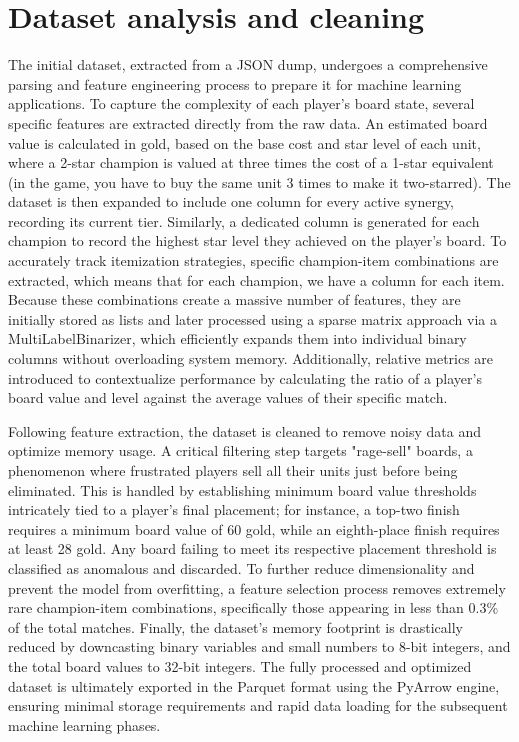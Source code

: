 \documentclass[12pt,a4paper]{extarticle}
\begin{document}
\section{Dataset analysis and cleaning}

The initial dataset, extracted from a JSON dump, undergoes a comprehensive parsing and feature engineering process to prepare it for machine learning applications. To capture the complexity of each player's board state, several specific features are extracted directly from the raw data. An estimated board value is calculated in gold, based on the base cost and star level of each unit, where a 2-star champion is valued at three times the cost of a 1-star equivalent (in the game, you have to buy the same unit 3 times to make it two-starred). The dataset is then expanded to include one column for every active synergy, recording its current tier. Similarly, a dedicated column is generated for each champion to record the highest star level they achieved on the player's board. To accurately track itemization strategies, specific champion-item combinations are extracted, which means that for each champion, we have a column for each item. Because these combinations create a massive number of features, they are initially stored as lists and later processed using a sparse matrix approach via a MultiLabelBinarizer, which efficiently expands them into individual binary columns without overloading system memory. Additionally, relative metrics are introduced to contextualize performance by calculating the ratio of a player's board value and level against the average values of their specific match.

Following feature extraction, the dataset is cleaned to remove noisy data and optimize memory usage. A critical filtering step targets "rage-sell" boards, a phenomenon where frustrated players sell all their units just before being eliminated. This is handled by establishing minimum board value thresholds intricately tied to a player's final placement; for instance, a top-two finish requires a minimum board value of 60 gold, while an eighth-place finish requires at least 28 gold. Any board failing to meet its respective placement threshold is classified as anomalous and discarded. To further reduce dimensionality and prevent the model from overfitting, a feature selection process removes extremely rare champion-item combinations, specifically those appearing in less than 0.3\% of the total matches. Finally, the dataset's memory footprint is drastically reduced by downcasting binary variables and small numbers to 8-bit integers, and the total board values to 32-bit integers. The fully processed and optimized dataset is ultimately exported in the Parquet format using the PyArrow engine, ensuring minimal storage requirements and rapid data loading for the subsequent machine learning phases.
\end{document}
